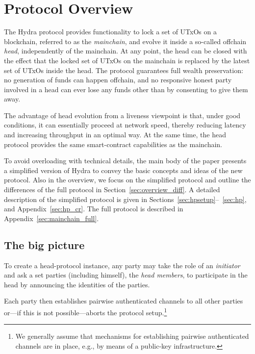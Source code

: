 \section{Protocol Overview}
\label{sec:overview}

The Hydra protocol provides functionality to lock a set of UTxOs on a
blockchain, referred to as the \emph{mainchain}, and evolve it inside a so-called offchain \emph{head}, independently of the
mainchain.  At any point, the head can be closed with the effect that the
locked set of UTxOs on the mainchain is replaced by the latest set of UTxOs
inside the head.
The protocol guarantees full wealth preservation: no generation
of funds can happen offchain, %
and no responsive
honest party involved in a head can ever lose any funds other than by
consenting to give them away.

The advantage of head evolution from a liveness viewpoint is that,
under good conditions, it can essentially proceed at network speed,
thereby reducing latency and increasing throughput in an optimal
way.  At the same time, the head protocol provides the same smart-contract
capabilities as the mainchain.

To avoid overloading with technical details, the main body of the paper presents a simplified
version of Hydra to convey the basic concepts and ideas
of the new protocol. Also in the overview, we focus on the simplified protocol
and outline the differences of the full protocol
in Section~\ref{sec:overview_diff}.
A detailed description of the simplified protocol is given in
Sections~\ref{sec:hpsetup}--~\ref{sec:hp},
and Appendix~\ref{sec:hp_cr}. The full protocol is described in
Appendix~\ref{sec:mainchain_full}.


\subsection{The big picture}
\label{sec:overview_bp}

To create a head-protocol instance, any party may take the role of an
\emph{initiator} and ask a set parties (including himself),
the \emph{head members}, to participate in the head by announcing the
identities of the parties.

Each party then establishes pairwise authenticated
channels to all other parties or---if this is not possible---aborts the protocol setup.\footnote{We generally assume that
  mechanisms for establishing pairwise
  authenticated channels are in place, e.g., by
  means of a public-key infrastructure.}

